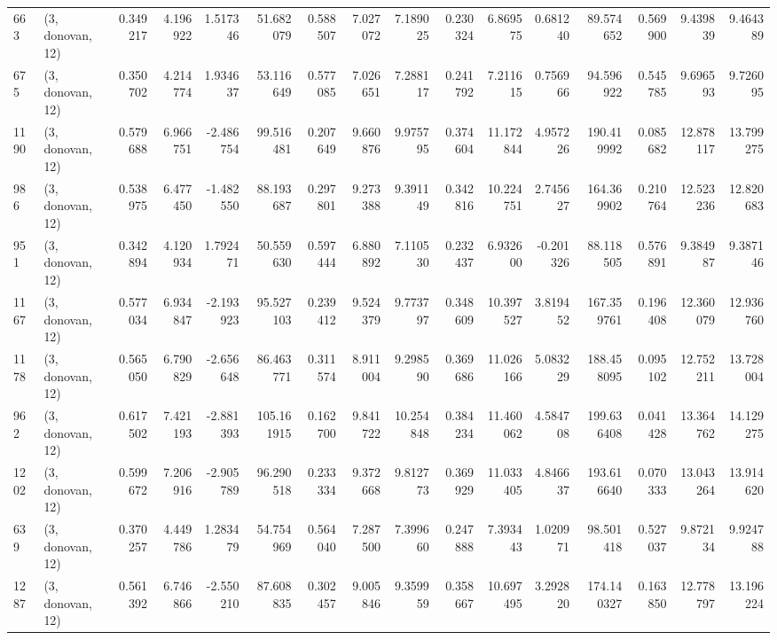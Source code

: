 \begin{tabular}{llrrrrrrrrrrrrrr}
663  &  (3, donovan, 12) &   0.349217 &   4.196922 &   1.517346 &     51.682079 &    0.588507 &    7.027072 &    7.189025 &  0.230324 &   6.869575 &   0.681240 &    89.574652 &   0.569900 &   9.439839 &   9.464389 \\
675  &  (3, donovan, 12) &   0.350702 &   4.214774 &   1.934637 &     53.116649 &    0.577085 &    7.026651 &    7.288117 &  0.241792 &   7.211615 &   0.756966 &    94.596922 &   0.545785 &   9.696593 &   9.726095 \\
1190 &  (3, donovan, 12) &   0.579688 &   6.966751 &  -2.486754 &     99.516481 &    0.207649 &    9.660876 &    9.975795 &  0.374604 &  11.172844 &   4.957226 &   190.419992 &   0.085682 &  12.878117 &  13.799275 \\
986  &  (3, donovan, 12) &   0.538975 &   6.477450 &  -1.482550 &     88.193687 &    0.297801 &    9.273388 &    9.391149 &  0.342816 &  10.224751 &   2.745627 &   164.369902 &   0.210764 &  12.523236 &  12.820683 \\
951  &  (3, donovan, 12) &   0.342894 &   4.120934 &   1.792471 &     50.559630 &    0.597444 &    6.880892 &    7.110530 &  0.232437 &   6.932600 &  -0.201326 &    88.118505 &   0.576891 &   9.384987 &   9.387146 \\
1167 &  (3, donovan, 12) &   0.577034 &   6.934847 &  -2.193923 &     95.527103 &    0.239412 &    9.524379 &    9.773797 &  0.348609 &  10.397527 &   3.819452 &   167.359761 &   0.196408 &  12.360079 &  12.936760 \\
1178 &  (3, donovan, 12) &   0.565050 &   6.790829 &  -2.656648 &     86.463771 &    0.311574 &    8.911004 &    9.298590 &  0.369686 &  11.026166 &   5.083229 &   188.458095 &   0.095102 &  12.752211 &  13.728004 \\
962  &  (3, donovan, 12) &   0.617502 &   7.421193 &  -2.881393 &    105.161915 &    0.162700 &    9.841722 &   10.254848 &  0.384234 &  11.460062 &   4.584708 &   199.636408 &   0.041428 &  13.364762 &  14.129275 \\
1202 &  (3, donovan, 12) &   0.599672 &   7.206916 &  -2.905789 &     96.290518 &    0.233334 &    9.372668 &    9.812773 &  0.369929 &  11.033405 &   4.846637 &   193.616640 &   0.070333 &  13.043264 &  13.914620 \\
639  &  (3, donovan, 12) &   0.370257 &   4.449786 &   1.283479 &     54.754969 &    0.564040 &    7.287500 &    7.399660 &  0.247888 &   7.393443 &   1.020971 &    98.501418 &   0.527037 &   9.872134 &   9.924788 \\
1287 &  (3, donovan, 12) &   0.561392 &   6.746866 &  -2.550210 &     87.608835 &    0.302457 &    9.005846 &    9.359959 &  0.358667 &  10.697495 &   3.292820 &   174.140327 &   0.163850 &  12.778797 &  13.196224 \\

\end{tabular}
